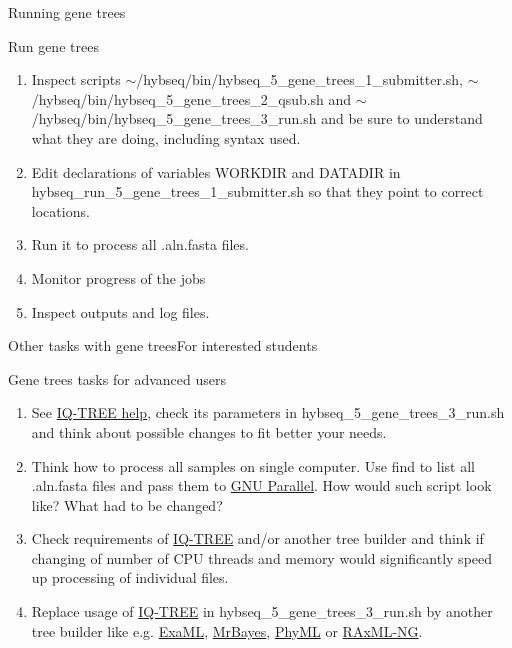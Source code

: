 \documentclass[compress,  xelatex, 11pt, xcolor=x11names, aspectratio=169,
	hyperref={
		bookmarks=true,
		unicode=true,
		colorlinks=true,
		pdftitle={HybSeq course},
		plainpages=false,
		pdfauthor={Vojtech Zeisek},
		pdfsubject={Practical processing of HybSeq target enrichment sequencing data on computing grids like MetaCentrum},
		pdfcreator={XeLaTeX},
		pdfkeywords={BASH, command line, GNU, HybSeq, Linux, MetaCentrum, sequencing shell, target enrichment},
		linkcolor=Turquoise4, %
		anchorcolor=DodgerBlue4, %
		citecolor=DodgerBlue4, %
		filecolor=DodgerBlue4, %
		menucolor=Tan4, %
		urlcolor=DarkOliveGreen4 %
		},
	url={hyphens, lowtilde} %
	]{beamer}
\renewcommand{\texttt}[1]{\colorbox{Cornsilk2}{{\ttfamily #1}}}
\begin{document}
\begin{frame}{Running gene trees}
	\begin{exampleblock}{Run gene trees}
		\begin{enumerate}
			\item Inspect scripts \texttt{$\sim$/hybseq/bin/hybseq\_5\_gene\_trees\_1\_submitter.sh}, \texttt{$\sim$/hybseq/bin/hybseq\_5\_gene\_trees\_2\_qsub.sh} and \texttt{$\sim$/hybseq/bin/hybseq\_5\_gene\_trees\_3\_run.sh} and be sure to understand what they are doing, including syntax used.
			\item Edit declarations of variables \texttt{WORKDIR} and \texttt{DATADIR} in \texttt{hybseq\_run\_5\_gene\_trees\_1\_submitter.sh} so that they point to correct locations.
			\item Run it to process all \texttt{*.aln.fasta} files.
			\item Monitor progress of the jobs
			\item Inspect outputs and log files.
		\end{enumerate}
	\end{exampleblock}
\end{frame}

\begin{frame}{Other tasks with gene trees}{For interested students}
	\begin{exampleblock}{Gene trees tasks for advanced users}
		\begin{enumerate}
			\item See \href{https://iqtree.github.io/doc/Command-Reference}{IQ-TREE help}, check its parameters in \texttt{hybseq\_5\_gene\_trees\_3\_run.sh} and think about possible changes to fit better your needs.
			\item Think how to process all samples on single computer. Use \texttt{find} to list all \texttt{*.aln.fasta} files and pass them to \href{https://www.gnu.org/software/parallel/}{GNU Parallel}. How would such script look like? What had to be changed?
			\item Check requirements of \href{https://iqtree.github.io/}{IQ-TREE} and/or another tree builder and think if changing of number of CPU threads and memory would significantly speed up processing of individual files.
			\item Replace usage of \href{https://iqtree.github.io/}{IQ-TREE} in \texttt{hybseq\_5\_gene\_trees\_3\_run.sh} by another tree builder like e.g. \href{https://github.com/stamatak/ExaML}{ExaML}, \href{https://nbisweden.github.io/MrBayes/}{MrBayes}, \href{https://github.com/stephaneguindon/phyml}{PhyML} or \href{https://github.com/amkozlov/raxml-ng}{RAxML-NG}.
		\end{enumerate}
	\end{exampleblock}
\end{frame}
\end{document}

